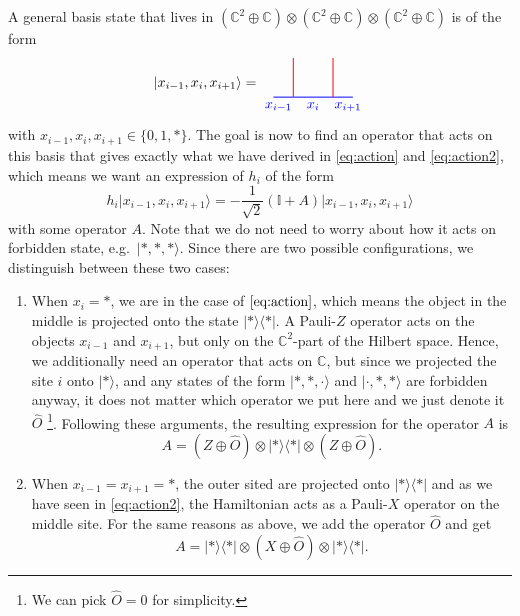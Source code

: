 A general basis state that lives in $(\mathbb{C}^2\oplus \mathbb{C})\otimes(\mathbb{C}^2\oplus \mathbb{C})\otimes(\mathbb{C}^2\oplus \mathbb{C})$ is of the form
	\begin{equation}
		\lvert x_{i-1}, x_i, x_{i+1}\rangle=\begin{tikzpicture}[scale=1,baseline=(current bounding box.center)]
		\draw [blue, line width=0.25mm] (-0.5,0) to node[below, near start] {$x_{i-1}$} (0,0);
		\draw [blue, line width=0.25mm] (0,0) to node[below] {$x_i$} (1,0);
		\draw [blue, line width=0.25mm] (1,0) to node[below, near end] {$x_{i+1}$} (1.5,0);
		\draw [red, line width=0.25mm] (0,0) -- (0,1);
		\draw [red, line width=0.25mm] (1,0) -- (1,1);
		\end{tikzpicture}
	\end{equation}
with $x_{i-1}, x_i, x_{i+1}\in\{0,1,*\}$. The goal is now to find an operator that acts on this basis that gives exactly what we have derived in \eqref{eq:action} and \eqref{eq:action2}, which means we want an expression of $h_i$ of the form
	\begin{equation}
		h_i\lvert x_{i-1},x_i,x_{i+1}\rangle=-\frac{1}{\sqrt{2}}\left(\mathbb{I}+A\right)\lvert x_{i-1},x_i,x_{i+1}\rangle
	\end{equation}
with some operator $A$. Note that we do not need to worry about how it acts on forbidden state, e.g.\ $\lvert *,*,*\rangle$. Since there are two possible configurations, we distinguish between these two cases:
	\begin{enumerate}
		\item When $x_i=*$, we are in the case of $\eqref{eq:action}$, which means the object in the middle is projected onto the state $\lvert*\rangle\langle*\rvert$. A Pauli-$Z$ operator acts on the objects $x_{i-1}$ and $x_{i+1}$, but only on the $\mathbb{C}^2$-part of the Hilbert space. Hence, we additionally need an operator that acts on $\mathbb{C}$, but since we projected the site $i$ onto $\lvert *\rangle$, and any states of the form $\lvert *,*,\cdot\rangle$ and $\lvert \cdot,*,*\rangle$ are forbidden anyway, it does not matter which operator we put here and we just denote it $\hat{O}$ \footnote{We can pick $\hat{O}=0$ for simplicity.}. Following these arguments, the resulting expression for the operator $A$ is
			\begin{equation}
				A=(Z\oplus\hat{O})\otimes\lvert*\rangle\langle*\rvert\otimes(Z\oplus\hat{O}).
			\end{equation}
		\item When $x_{i-1}=x_{i+1}=*$, the outer sited are projected onto $\lvert*\rangle\langle*\rvert$ and as we have seen in \eqref{eq:action2}, the Hamiltonian acts as a Pauli-$X$ operator on the middle site. For the same reasons as above, we add the operator $\hat{O}$ and get
			\begin{equation}
				A=\lvert*\rangle\langle*\rvert\otimes(X\oplus\hat{O})\otimes\lvert*\rangle\langle*\rvert.
			\end{equation}
	\end{enumerate}
